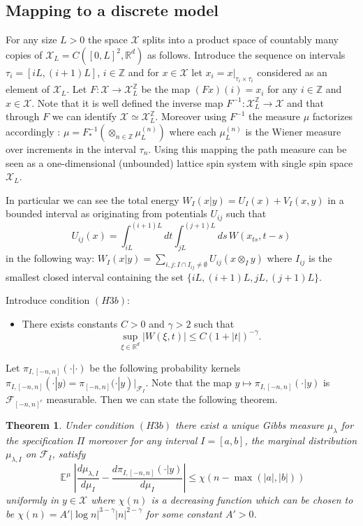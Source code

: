 \documentclass[a4paper,12pt,reqno]{amsart}
\newtheorem{theorem}{Theorem}
\DeclareMathOperator{\expect}{{\mathbb E}}
\newcommand{\R}{\mathbb{R}}
\newcommand{\Z}{\mathbb{Z}}
\newcommand{\X}{\mathcal{X}}
\newcommand{\F}{\mathcal{F}}
\begin{document}
\subsection{Mapping to a discrete model}
For any size $L > 0$ the space $\X$ splits into a product space of
countably many copies of $\X_L = C([0,L]^2,\R^d)$ as follows.
Introduce the sequence on intervals $\tau_i = [iL,(i+1)L]$, $i \in
\mathbb{Z}$ and for $x \in \X$ let $x_i = x|_{\tau_i \times \tau_i}$
considered as an element of $\X_L$. Let $F : \X \to \X_L^{\Z}$ be the
map $(F x)(i) = x_i$ for any $i \in \Z$ and $x \in \X$. Note that it
is well defined the inverse map $F^{-1} : \X_L^{\mathbb{Z}} \to \X$
and that through $F$ we can identify $\X \simeq \X_L^{\Z}$. Moreover
using $F^{-1}$ the measure $\mu$ factorizes accordingly : $\mu =
F^{-1}_* (\otimes_{n \in \Z} \mu_L^{(n)})$ where each $\mu^{(n)}_L$ is
the Wiener measure over increments in the interval $\tau_n$. Using
this mapping the path measure can be seen as a one-dimensional
(unbounded) lattice spin system with single spin space $\X_L$. 

In particular we can see the total energy $W_I(x|y) = U_I(x) + V_I(x,y)$ in a bounded interval
as originating from potentials $U_{ij}$ such that
$$
U_{ij}(x) = \int_{iL}^{(i+1)L} dt \int_{jL}^{(j+1)L} ds\, W(x_{ts},t-s)
$$
in the following way:
$
W_I(x|y) =\sum_{i,j : I \cap I_{ij} \neq \emptyset} U_{ij}(x \otimes_I y)
$
where $I_{ij}$ is the smallest closed interval containing the set
$\{iL,(i+1)L,jL,(j+1)L\}$. 

Introduce condition $(H3b)$:
\begin{itemize}
\item[H3b)] There exists  constants $C > 0$ and $\gamma > 2$ such that
$$
\sup_{\xi\in \R^d}|W(\xi,t)| \le C (1+|t|)^{-\gamma}.
$$
\end{itemize}


Let $\pi_{I,[-n,n]}(\cdot|\cdot)$ be the following probability kernels
$
\pi_{I,[-n,n]}(\cdot|y) = \pi_{[-n,n]}(\cdot|y)|_{\F_I}
$.
Note that the map $y \mapsto \pi_{I,[-n,n]}(\cdot|y)$ is
$\F_{[-n,n]^c}$ measurable.
Then we can state the following theorem.

\begin{theorem}
\label{th:dobr2}
Under condition $(H3b)$ there exist a unique Gibbs measure $\mu_\lambda$ for the
specification $\Pi$ moreover for any interval $I=[a,b]$, the marginal distribution
$\mu_{\lambda,I}$ on $\F_I$, satisfy
\begin{equation}
  \label{eq:corr-bounds-xx}
\expect^\mu \left|\frac{d\mu_{\lambda,I}}{d\mu_I} - \frac{d\pi_{I,[-n,n]}(\cdot|y)}{d\mu_I}
\right| \le  \chi(n-\max(|a|,|b|))
\end{equation}
uniformly in $y \in \X$
where $\chi(n)$ is a decreasing function which can be chosen to be
$\chi(n) = A' |\log n|^{3-\gamma} |n|^{2-\gamma}$ for some constant $A'>0$.
\end{theorem}
\end{document}
